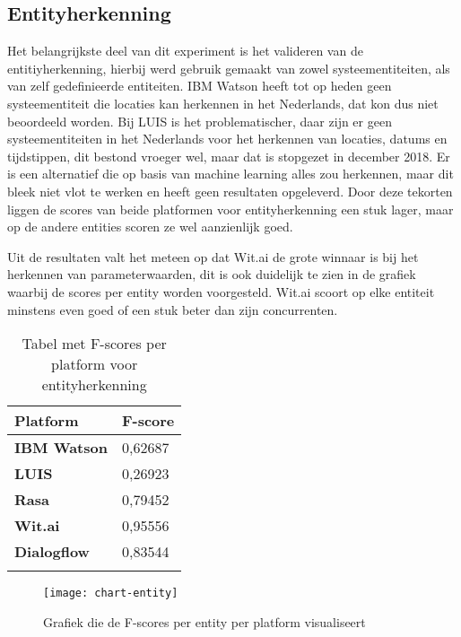 \subsection{Entityherkenning}

Het belangrijkste deel van dit experiment is het valideren van de entitiyherkenning, hierbij werd gebruik gemaakt van zowel systeementiteiten, als van zelf gedefinieerde entiteiten. IBM Watson heeft tot op heden geen systeementiteit die locaties kan herkennen in het Nederlands, dat kon dus niet beoordeeld worden. Bij LUIS is het problematischer, daar zijn er geen systeementiteiten in het Nederlands voor het herkennen van locaties, datums en tijdstippen, dit bestond vroeger wel, maar dat is stopgezet in december 2018. Er is een alternatief die op basis van machine learning alles zou herkennen, maar dit bleek niet vlot te werken en heeft geen resultaten opgeleverd. Door deze tekorten liggen de scores van beide platformen voor entityherkenning een stuk lager, maar op de andere entities scoren ze wel aanzienlijk goed. 

Uit de resultaten valt het meteen op dat Wit.ai de grote winnaar is bij het herkennen van parameterwaarden, dit is ook duidelijk te zien in de grafiek waarbij de scores per entity worden voorgesteld. Wit.ai scoort op elke entiteit minstens even goed of een stuk beter dan zijn concurrenten.

\begin{center}
    \begin{longtable}{| l | l |}
        \hline
        \textbf{Platform} & \textbf{F-score} \\ \hline
        \textbf{IBM Watson} & 0,62687 \\ \hline  
        \textbf{LUIS} & 0,26923 \\ \hline  
        \textbf{Rasa} & 0,79452 \\ \hline  
        \textbf{Wit.ai} & 0,95556  \\ \hline  
        \textbf{Dialogflow} & 0,83544 \\ \hline  
        \caption{Tabel met F-scores per platform voor entityherkenning}                                    
    \end{longtable}
    \label{tbl:results-entity}
\end{center}

\begin{figure}[H]
    \label{fig:chart-entity}
    \centering
    \texttt{[image: chart-entity]}
    \caption{Grafiek die de F-scores per entity per platform visualiseert}
\end{figure}

